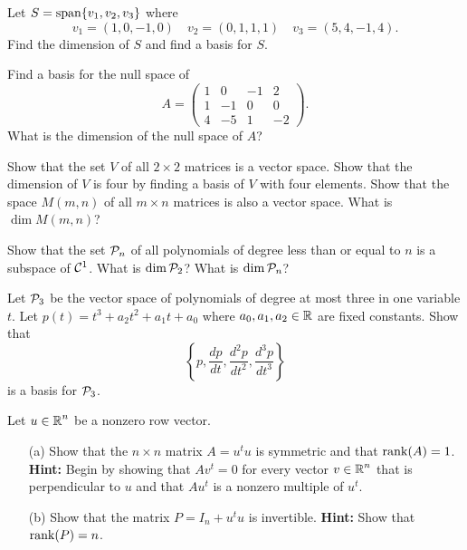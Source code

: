 \documentclass{ximera}
\begin{document}
\begin{exercise} \label{c5.5.2}
Let $S={\rm span}\{v_1,v_2,v_3\}$ where
\[
v_1=(1,0,-1,0) \quad v_2=(0,1,1,1) \quad v_3=(5,4,-1,4).
\]
Find the dimension of $S$ and find a basis for $S$.
\end{exercise}

\begin{exercise} \label{c5.5.3}
Find a basis for the null space of
\[
A =\left(\begin{array}{rrrr} 1 & 0 & -1 & 2\\ 1 & -1 & 0 & 0\\
4 & -5 & 1 & -2 \end{array} \right).
\]
What is the dimension of the null space of $A$?
\end{exercise}

\begin{exercise} \label{c5.5.4}
Show that the set $V$ of all $2\times 2$ matrices is a vector space.
Show that the dimension of $V$ is four by finding a basis of $V$
with four elements.  Show that the space $M(m,n)$ of all $m\times n$
matrices is also a vector space.  What is $\dim M(m,n)$?
\end{exercise}

\begin{exercise} \label{c5.5.5}
Show that the set ${\cal P}_n$ of all polynomials of degree less than
or equal to $n$ is a subspace of ${\cal C}^1$.  What is $\dim {\cal P}_2$?
What is $\dim {\cal P}_n$?
\end{exercise}

\begin{exercise} \label{c5.5.6}
Let ${\cal P}_3$ be the vector space of polynomials of degree at
most three in one variable $t$.  Let $p(t)=t^3+a_2t^2+a_1t+a_0$ where
$a_0,a_1,a_2\in\mbox{$\Bbb{R}$}$ are fixed constants.  Show that
\[
\left\{ p, \frac{dp}{dt}, \frac{d^2p}{dt^2}, \frac{d^3p}{dt^3}\right\}
\]
is a basis for ${\cal P}_3$.
\end{exercise}

\begin{exercise} \label{c5.5.7}
Let $u\in\mbox{$\Bbb{R}$}^n$ be a nonzero row vector.
\begin{itemize}
\item[(a)]  Show that the $n\times n$ matrix $A=u^tu$ is symmetric and that
${\rm rank}(A)=1$.  {\bf Hint:}  Begin by showing that $Av^t=0$ for every vector
$v\in\mbox{$\Bbb{R}$}^n$ that is perpendicular to $u$ and that $Au^t$ is a nonzero multiple
of $u^t$.
\item[(b)]  Show that the matrix $P=I_n+u^tu$ is invertible.  {\bf Hint:}
Show that ${\rm rank}(P)=n$.
\end{itemize}
\end{exercise}
\end{document}
